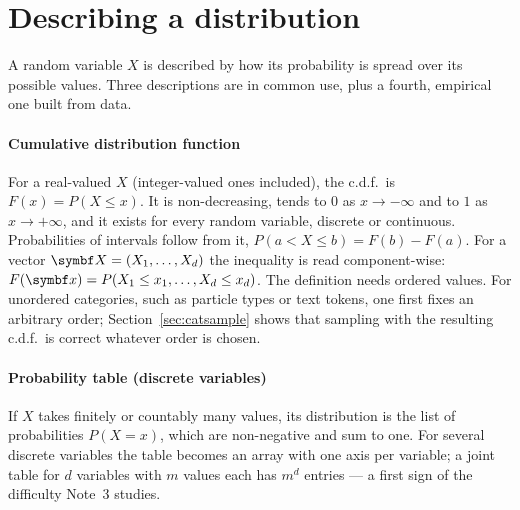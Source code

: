 \documentclass[11pt]{article}
\begin{document}

\section{Describing a distribution}\label{sec:describe}

A random variable $X$ is described by how its probability is spread over its possible values. Three descriptions
are in common use, plus a fourth, empirical one built from data.

\paragraph{Cumulative distribution function} For a real-valued $X$ (integer-valued ones included), the c.d.f.\ is $F(x) = P(X \le x)$. It is
non-decreasing, tends to $0$ as $x \to -\infty$ and to $1$ as $x \to +\infty$, and it exists for every random
variable, discrete or continuous. Probabilities of intervals follow from it, $P(a < X \le b) = F(b) - F(a)$. For a
vector $\X = (X_1, \dots, X_d)$ the inequality is read component-wise:
$F(\x) = P(X_1 \le x_1, \dots, X_d \le x_d)$. The definition needs ordered values. For unordered categories, such as
particle types or text tokens, one first fixes an arbitrary order; Section~\ref{sec:catsample} shows that sampling
with the resulting c.d.f.\ is correct whatever order is chosen.

\paragraph{Probability table (discrete variables)} If $X$ takes finitely or countably many values, its distribution
is the list of probabilities $P(X = x)$, which are non-negative and sum to one. For several discrete variables the
table becomes an array with one axis per variable; a joint table for $d$ variables with $m$ values each has $m^d$
entries --- a first sign of the difficulty Note~3 studies.
\end{document}
